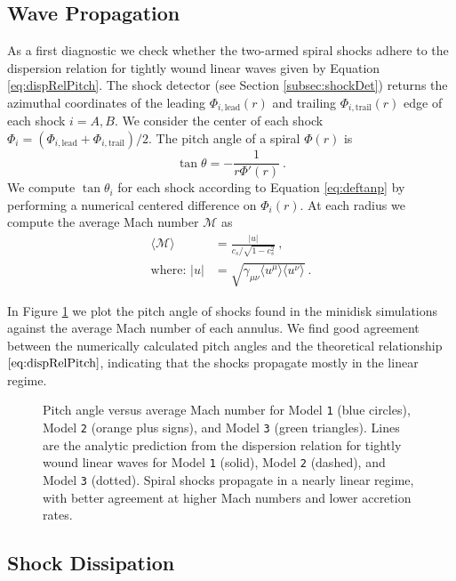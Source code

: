 \documentclass{emulateapj}
\newcommand{\model}[1]{{Model \texttt{#1}}}
\begin{document}
\subsection{Wave Propagation}
\label{subsec:res-prop}

As a first diagnostic we check whether the two-armed spiral shocks adhere to the dispersion relation for tightly wound linear waves given by Equation \eqref{eq:dispRelPitch}.  The shock detector (see Section \ref{subsec:shockDet}) returns the azimuthal coordinates of the leading $\Phi_{i,\text{lead}}(r)$ and trailing $\Phi_{i,\text{trail}}(r)$ edge of each shock $i=A,B$.  We consider the center of each shock $\Phi_i = (\Phi_{i,\text{lead}} + \Phi_{i,\text{trail}}) / 2$.  The pitch angle of a spiral $\Phi(r)$ is
\begin{equation}
	\tan \theta = -\frac{1}{r \Phi'(r)} \ . \label{eq:deftanp} 
\end{equation}
We compute $\tan \theta_i$ for each shock according to Equation \eqref{eq:deftanp} by performing a numerical centered difference on $\Phi_i(r)$.  At each radius we compute the average Mach number $\mathcal{M}$ as
\begin{align}
	\langle \mathcal{M} \rangle &=  \frac{|u|}{c_s / \sqrt{1-c_s^2}} \ , \\
	\text{where: } |u| &= \sqrt{\gamma_{\mu\nu} \langle u^\mu \rangle  \langle u^\nu \rangle} \nonumber \ .
\end{align}

In Figure \ref{fi:disp} we plot the pitch angle of shocks found in the minidisk simulations against the average Mach number of each annulus. We find good agreement between the numerically calculated pitch angles and the theoretical relationship $\eqref{eq:dispRelPitch}$, indicating that the shocks propagate mostly in the linear regime.

\begin{figure}
\caption{\label{fi:disp} Pitch angle versus average Mach number for \model{1} (blue circles), \model{2} (orange plus signs), and \model{3} (green triangles). Lines are the analytic prediction from the dispersion relation for tightly wound linear waves for \model{1} (solid), \model{2} (dashed), and \model{3} (dotted).  Spiral shocks propagate in a nearly linear regime, with better agreement at higher Mach numbers and lower accretion rates.}
\end{figure}


\subsection{Shock Dissipation}
\label{subsec:diss}
\end{document}
